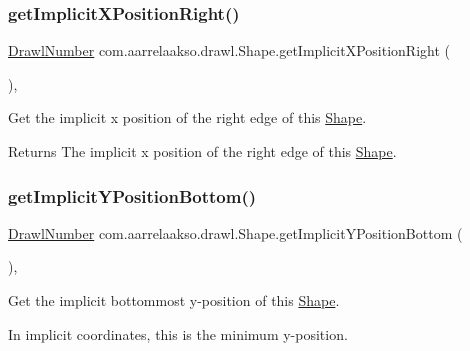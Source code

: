 \subsubsection{\texorpdfstring{get\+Implicit\+X\+Position\+Right()}{getImplicitXPositionRight()}}
{\footnotesize\ttfamily \hyperlink{classcom_1_1aarrelaakso_1_1drawl_1_1_drawl_number}{Drawl\+Number} com.\+aarrelaakso.\+drawl.\+Shape.\+get\+Implicit\+X\+Position\+Right (\begin{DoxyParamCaption}{ }\end{DoxyParamCaption})\hspace{0.3cm}{\ttfamily [protected]}, {\ttfamily [inherited]}}



Get the implicit x position of the right edge of this \hyperlink{classcom_1_1aarrelaakso_1_1drawl_1_1_shape}{Shape}. 

\begin{DoxyReturn}{Returns}
The implicit x position of the right edge of this \hyperlink{classcom_1_1aarrelaakso_1_1drawl_1_1_shape}{Shape}. 
\end{DoxyReturn}
\mbox{\label{classcom_1_1aarrelaakso_1_1drawl_1_1_shape_af04961079cb3993d8f73670e6695415b}} 
\subsubsection{\texorpdfstring{get\+Implicit\+Y\+Position\+Bottom()}{getImplicitYPositionBottom()}}
{\footnotesize\ttfamily \hyperlink{classcom_1_1aarrelaakso_1_1drawl_1_1_drawl_number}{Drawl\+Number} com.\+aarrelaakso.\+drawl.\+Shape.\+get\+Implicit\+Y\+Position\+Bottom (\begin{DoxyParamCaption}{ }\end{DoxyParamCaption})\hspace{0.3cm}{\ttfamily [protected]}, {\ttfamily [inherited]}}



Get the implicit bottommost y-\/position of this \hyperlink{classcom_1_1aarrelaakso_1_1drawl_1_1_shape}{Shape}. 

In implicit coordinates, this is the minimum y-\/position.

